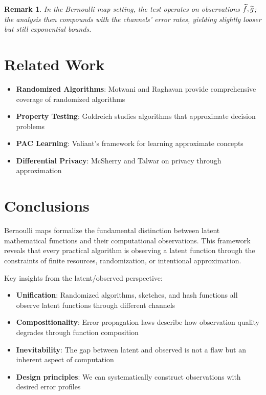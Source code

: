 \documentclass[11pt,final,hidelinks]{article}
\newtheorem{remark}[theorem]{Remark}
\begin{document}
\begin{remark}
In the Bernoulli map setting, the test operates on observations $\widetilde{f},\widetilde{g}$; the analysis then compounds with the channels' error rates, yielding slightly looser but still exponential bounds.
\end{remark}

\section{Related Work}

\begin{itemize}
    \item \textbf{Randomized Algorithms}: Motwani and Raghavan \cite{motwani1995} provide comprehensive coverage of randomized algorithms
    \item \textbf{Property Testing}: Goldreich \cite{goldreich2017} studies algorithms that approximate decision problems
    \item \textbf{PAC Learning}: Valiant's framework \cite{valiant1984} for learning approximate concepts
    \item \textbf{Differential Privacy}: McSherry and Talwar \cite{mcsherry2007} on privacy through approximation
\end{itemize}

\section{Conclusions}

Bernoulli maps formalize the fundamental distinction between latent mathematical functions and their computational observations. This framework reveals that every practical algorithm is observing a latent function through the constraints of finite resources, randomization, or intentional approximation.

Key insights from the latent/observed perspective:
\begin{itemize}
    \item \textbf{Unification}: Randomized algorithms, sketches, and hash functions all observe latent functions through different channels
    \item \textbf{Compositionality}: Error propagation laws describe how observation quality degrades through function composition
    \item \textbf{Inevitability}: The gap between latent and observed is not a flaw but an inherent aspect of computation
    \item \textbf{Design principles}: We can systematically construct observations with desired error profiles
\end{itemize}
\end{document}
